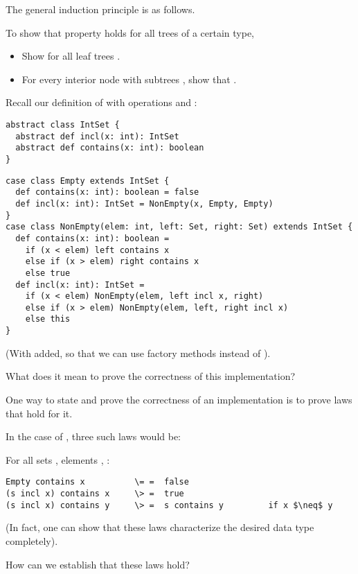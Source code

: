 {The general induction principle is as follows.

To show that property  holds for all trees of a certain type,
\begin{itemize}
\item Show  for all leaf trees .
\item For every interior node  with subtrees , 
      show that .
\end{itemize} 

\example Recall our definition of  with 
operations  and :

\begin{lstlisting}
abstract class IntSet {
  abstract def incl(x: int): IntSet
  abstract def contains(x: int): boolean
}
\end{lstlisting}
\es\bs
\begin{lstlisting}
case class Empty extends IntSet {
  def contains(x: int): boolean = false
  def incl(x: int): IntSet = NonEmpty(x, Empty, Empty)
}
case class NonEmpty(elem: int, left: Set, right: Set) extends IntSet {
  def contains(x: int): boolean = 
    if (x < elem) left contains x
    else if (x > elem) right contains x
    else true
  def incl(x: int): IntSet = 
    if (x < elem) NonEmpty(elem, left incl x, right)
    else if (x > elem) NonEmpty(elem, left, right incl x)
    else this
}
\end{lstlisting}
(With  added, so that we can use factory methods instead of ).

What does it mean to prove the correctness of this implementation?
\es
{}

One way to state and prove the correctness of an implementation is
to prove laws that hold for it.

In the case of , three such laws would be:

For all sets , elements , :

\begin{lstlisting}
Empty contains x          \= =  false
(s incl x) contains x     \> =  true
(s incl x) contains y     \> =  s contains y         if x $\neq$ y
\end{lstlisting}

(In fact, one can show that these laws characterize the desired data
type completely).

How can we establish that these laws hold?

}
